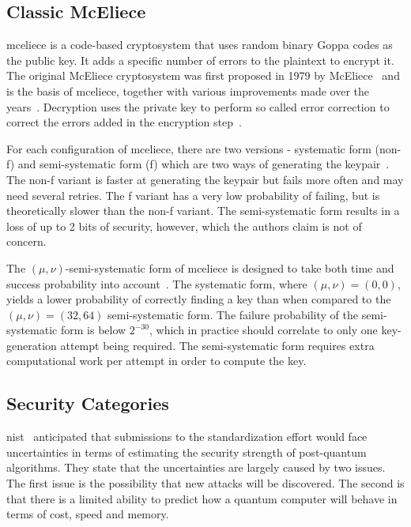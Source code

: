 \subsection{Classic McEliece}
\label{section:background:mceliece}
\gls{mceliece} is a code-based cryptosystem that uses random binary Goppa codes as the public key. It adds a specific number of errors to the plaintext to encrypt it. The original McEliece cryptosystem was first proposed in 1979 by McEliece~\cite{mceliece1978} and is the basis of \gls{mceliece}, together with various improvements made over the years~\cite{mceliece2020}. Decryption uses the private key to perform so called error correction to correct the errors added in the encryption step~\cite{mceliece2020}.
 
For each configuration of \gls{mceliece}, there are two versions - systematic form (non-f) and semi-systematic form (f) which are two ways of generating the keypair~\cite{mceliece2020}. The non-f variant is faster at generating the keypair but fails more often and may need several retries. The f variant has a very low probability of failing, but is theoretically slower than the non-f variant. The semi-systematic form results in a loss of up to 2 bits of security, however, which the authors claim is not of concern.

The $(\mu, \nu)$-semi-systematic form of \gls{mceliece} is designed to take both time and success probability into account~\cite{mceliece2020}. The systematic form, where $(\mu, \nu)=(0, 0)$, yields a lower probability of correctly finding a key than when compared to the $(\mu, \nu)=(32,64)$ semi-systematic form. The failure probability of the semi-systematic form is below $2^{-30}$, which in practice should correlate to only one key-generation attempt being required. The semi-systematic form requires extra computational work per attempt in order to compute the key.

\subsection{Security Categories}
\label{section:background:security-categories}

\gls{nist}~\cite{nist2017} anticipated that submissions to the standardization effort would face uncertainties in terms of estimating the security strength of \gls{post-quantum} algorithms. They state that the uncertainties are largely caused by two issues. The first issue is the possibility that new attacks will be discovered. The second is that there is a limited ability to predict how a quantum computer will behave in terms of cost, speed and memory.

